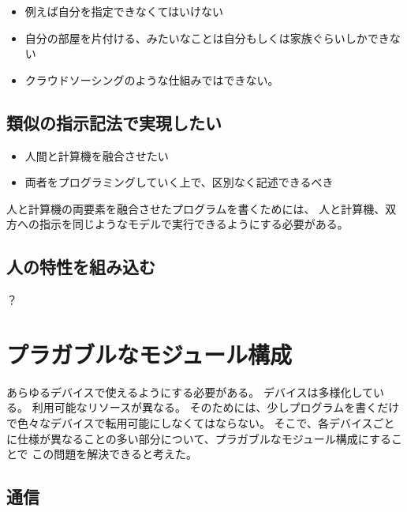 \begin{itemize}
\itemsep1pt\parskip0pt
\item
  例えば自分を指定できなくてはいけない
\item
  自分の部屋を片付ける、みたいなことは自分もしくは家族ぐらいしかできない
\item
  クラウドソーシングのような仕組みではできない。
\end{itemize}

\subsection{類似の指示記法で実現したい}\label{ux985eux4f3cux306eux6307ux793aux8a18ux6cd5ux3067ux5b9fux73feux3057ux305fux3044}

\begin{itemize}
\itemsep1pt\parskip0pt
\item
  人間と計算機を融合させたい
\item
  両者をプログラミングしていく上で、区別なく記述できるべき
\end{itemize}

人と計算機の両要素を融合させたプログラムを書くためには、
人と計算機、双方への指示を同じようなモデルで実行できるようにする必要がある。

\subsection{人の特性を組み込む}\label{ux4ebaux306eux7279ux6027ux3092ux7d44ux307fux8fbcux3080}

？

\section{プラガブルなモジュール構成}\label{ux30d7ux30e9ux30acux30d6ux30ebux306aux30e2ux30b8ux30e5ux30fcux30ebux69cbux6210}

あらゆるデバイスで使えるようにする必要がある。
デバイスは多様化している。 利用可能なリソースが異なる。
そのためには、少しプログラムを書くだけで色々なデバイスで転用可能にしなくてはならない。
そこで、各デバイスごとに仕様が異なることの多い部分について、プラガブルなモジュール構成にすることで
この問題を解決できると考えた。

\subsection{通信}\label{ux901aux4fe1}

